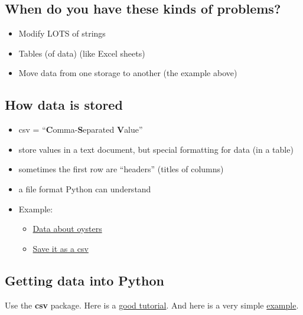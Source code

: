 \documentclass[letterpaper,10pt,english]{/usr/local/lib/python2.7/dist-packages/sphinx/texinputs/sphinxhowto}
\begin{document}
        
    
\subsection{When do you have these kinds of problems?}

\begin{itemize}
\item
  Modify LOTS of strings
\item
  Tables (of data) (like Excel sheets)
\item
  Move data from one storage to another (the example above)
\end{itemize}\subsection{How data is stored}

\begin{itemize}
\item
  csv = ``\textbf{C}omma-\textbf{S}eparated \textbf{V}alue''
\item
  store values in a text document, but special formatting for data (in a
  table)
\item
  sometimes the first row are ``headers'' (titles of columns)
\item
  a file format Python can understand
\item
  Example:
  \begin{itemize}
  \item
    \href{http://www.amstat.org/publications/jse/jse\_data\_archive.htm}{Data
    about oysters}
  \item
    \href{http://www.amstat.org/publications/jse/datasets/30oysters.dat.txt}{Save
    it as a csv}
  \end{itemize}
\end{itemize}\subsection{Getting data into Python}

Use the \textbf{csv} package. Here is a
\href{http://www.pythonforbeginners.com/systems-programming/using-the-csv-module-in-python/}{good
tutorial}. And here is a very simple
\href{https://github.com/meet-projects/sample-YL1-individual-project/blob/master/csv\_package\_demo.py}{example}.

\end{document}
